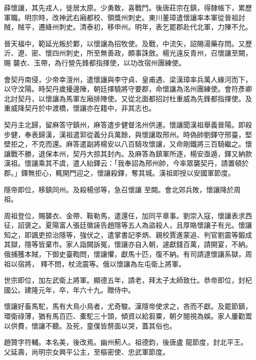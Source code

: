 \begin{pinyinscope}
 薛懷讓，其先戎人，徙居太原。少勇敢，喜戰鬥。後唐莊宗在鎮，得隸帳下，累歷軍職。明宗時，改神武右廂都校、領獎州刺史。東川董璋遣懷讓率本軍從晉祖討賊，賊平，遷絳州刺史。清泰初，移申州。明年，表乞罷郡赴代北軍，力陳不允。



 晉天福中，範延光叛於鄴，以懷讓為招牧使。及戰，中流矢，詔賜湯藥存問。又歷沂、遼、密、懷四州刺史，所至無善政，頗事誅斂。楊光遠反青州，召懷讓至闕，賜
 襲衣、玉帶，為行營先鋒都指揮使，以功改宿州團練使。



 會契丹南侵，少帝幸澶州，遣懷讓與李守貞、皇甫遇、梁漢璋率兵萬人緣河而下，以守汶陽。時契丹歲擾邊陲，朝廷擇驍將守要郡，命懷讓為洺州團練使。會符彥卿北討契丹，以懷讓為馬軍左廂排陣使。又從北面都招討杜重威為先鋒都指揮使。及重威降契丹於中渡橋，懷讓亦在籍中，非其志也。



 契丹主北歸，留麻答守鎮州，麻答遣步健督洺州供運。懷讓聞漢祖舉義晉陽。即殺
 步健，奉表歸漢，漢祖遣郭從義分兵萬餘，與懷讓取邢州。時偽帥劉鐸守邢臺，堅壁拒之，不克而還。麻答遣副將楊安以八百騎攻懷讓，又命剛鐵將三百騎繼之。懷讓戰不勝，退保本州，契丹大掠其封內。及麻答為鎮軍所逐，楊安亟遁，鐸又納款漢祖。懷讓乘其不虞，遣人紿鐸云：「我奉詔為邢州帥，今率眾襲契丹，請置頓於郡。」鐸無拒心，輒開門迎之，懷讓殺鐸，奪其城。漢祖即授以安國軍節度。



 隱帝即位，移鎮同州。及殺楊邠等，急召懷讓
 至闕。會北郊兵敗，懷讓降於周祖。



 周祖登位，賜襲衣、金帶、鞍勒馬，遣還任，加同平章事。劉崇入寇，懷讓表求西征，詔褒之。夏陽富人張廷徽誣告趙隱等五人為盜殺人，且厚賂懷讓子有光。懷讓知之，即諷吏掠治隱等，強伏之，遣掌書記李炳、親校賈進蒙追、判官劉震等鍛成其獄，隱等皆棄市。家人詣闕訴冤，懷讓亦自入朝，遽獻錢百萬，請開宴，不納。俄捕獲本賊，下御史臺鞫問，懷讓懼，獻馬十匹，復不納。有司請逮懷讓系獄，周祖以宿將，
 釋不問，杖流震等。俄以懷讓為左屯衛上將軍。



 世宗即位，加左武衛上將軍。顯德五年，請老，拜太子太師致仕。恭帝即位，封杞國公。建隆元年，卒，年六十九。贈侍中。



 懷讓好畜馬駝，馬有大鳥小鳥者，尤奇駿。漢隱帝使求之，吝而不獻。及罷節鎮，環衛祿薄，猶有馬百匹、橐駝三十頭，傾資以給芻粟，朝夕閱視為娛。家人屢勸鬻以供費，懷讓不聽。及死，童僕皆剺面以哭，蓋其俗也。



 趙贊字符輔。本名美，後改焉。幽州薊人。祖德鈞，後唐盧
 龍節度，封北平王。父延壽，尚明宗女興平公主，至樞密使、忠武軍節度。




\end{pinyinscope}
